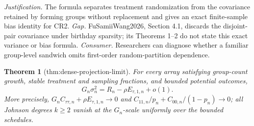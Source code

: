 \documentclass{article}
\newtheorem{theorem}{Theorem}
\begin{document}
\par\smallskip\noindent \textit{Justification.} The formula separates treatment randomization from the covariance retained by forming groups without replacement and gives an exact finite-sample bias identity for CR2. \textit{Gap.} FuSamiiWang2026, Section 4.1, discards the disjoint-pair covariance under birthday sparsity; its Theorems 1--2 do not state this exact variance or bias formula. \textit{Consumer.} Researchers can diagnose whether a familiar group-level sandwich omits first-order random-partition dependence.

\begin{theorem}[thm:dense-projection-limit]\label{thm:dense-projection-limit}
For every array satisfying group-count growth, stable treatment and sampling fractions, and bounded potential outcomes, \[G_n\sigma_n^2=R_n-\rho E_{\tau,1,n}+o(1).\] More precisely, \(G_nC_{\tau\tau,n}+\rho E_{\tau,1,n}\to0\) and \(C_{11,n}/p_n+C_{00,n}/(1-p_n)\to0\); all Johnson degrees \(k\ge2\) vanish at the \(G_n\)-scale uniformly over the bounded schedules.
\end{theorem}
\end{document}
